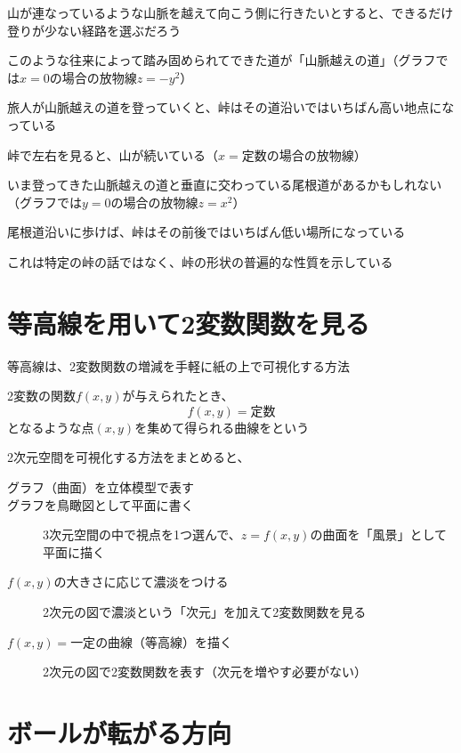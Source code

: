 \documentclass[../book_jiriki_calc]{subfiles}
\begin{document}
山が連なっているような山脈を越えて向こう側に行きたいとすると、できるだけ登りが少ない経路を選ぶだろう

このような往来によって踏み固められてできた道が「山脈越えの道」（グラフでは$x=0$の場合の放物線$z = -y^2$）

\br

旅人が山脈越えの道を登っていくと、峠はその道沿いではいちばん高い地点になっている

峠で左右を見ると、山が続いている（$x=\text{定数}$の場合の放物線）

\br

いま登ってきた山脈越えの道と垂直に交わっている尾根道があるかもしれない（グラフでは$y=0$の場合の放物線$z = x^2$）

尾根道沿いに歩けば、峠はその前後ではいちばん低い場所になっている

\br

これは特定の峠の話ではなく、峠の形状の普遍的な性質を示している

\section{等高線を用いて2変数関数を見る}

等高線は、2変数関数の増減を手軽に紙の上で可視化する方法

\br

2変数の関数$f(x, y)$が与えられたとき、
\begin{equation*}
  f(x, y) = \text{定数}
\end{equation*}
となるような点$(x, y)$を集めて得られる曲線をという

\sectionline

2次元空間を可視化する方法をまとめると、

\begin{description}
  \item[グラフ（曲面）を立体模型で表す]
  \item[グラフを鳥瞰図として平面に書く] 3次元空間の中で視点を1つ選んで、$z=f(x,y)$の曲面を「風景」として平面に描く
  \item[$f(x,y)$の大きさに応じて濃淡をつける] 2次元の図で濃淡という「次元」を加えて2変数関数を見る
  \item[$f(x,y)=\text{一定}$の曲線（等高線）を描く] 2次元の図で2変数関数を表す（次元を増やす必要がない）
\end{description}

\section{ボールが転がる方向}
\end{document}
